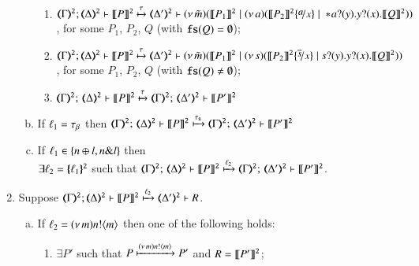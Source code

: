\begin{enumerate}[1.]
\begin{enumerate}[a)]
				\begin{enumerate}[-]
					\item	%
						$
						\horel{\tmap{\Gamma}{2}}{\tmap{\Delta}{2}}{\pmap{P}{2}}
						{\hby{\tau}}
						{\tmap{\Delta'}{2}}{}{\newsp{\tilde{m}}{\pmap{P_1}{2} \Par \newsp{a}
						{\pmap{P_2}{2}\subst{a}{x} \Par \repl{} \binp{a}{y} \binp{y}{x} \pmap{Q}{2}}}}
						$, for some $P_1$, $P_2$, $Q$ (with { $\mathtt{fs}(Q) = \emptyset$});

					\item	%
						$
						\horel{\tmap{\Gamma}{2}}{\tmap{\Delta}{2}}{\pmap{P}{2}}
						{\hby{\tau}}
						{\tmap{\Delta'}{2}}{}{\newsp{\tilde{m}}{\pmap{P_1}{2} \Par \newsp{s}
						{\pmap{P_2}{2}\subst{\dual{s}}{x} \Par \binp{s}{y} \binp{y}{x} \pmap{Q}{2}}}}
						$, for some $P_1$, $P_2$, $Q$ (with { $\mathtt{fs}(Q) \neq \emptyset$});

					\item	%
						$\tmap{\Gamma}{2};\, \tmap{\Delta}{2} \proves \pmap{P}{2}
						\hby{\tau}
						\tmap{\Gamma}{2};\, \tmap{\Delta'}{2} \proves \pmap{P'}{2}$


				\end{enumerate}
				
				\item	If $\ell_1 = \tau_{\beta}$ then
						$\tmap{\Gamma}{2};\, \tmap{\Delta}{2} \proves \pmap{P}{2}
						\hby{\stau}
						\tmap{\Gamma}{2};\, \tmap{\Delta'}{2} \proves \pmap{P'}{2}$

 

			\item	 
				If  
				$\ell_1 \in \{n \oplus l, n \& l\}$
				 then \\
				$\exists \ell_2 = \{\!\!\{\ell_1\}\!\!\}^{\mathtt{2}}$ such that 
				$\tmap{\Gamma}{2};\,\tmap{\Delta}{2} \proves  \pmap{P}{2}
				\hby{\ell_2}
				\tmap{\Gamma}{2};\,\tmap{\Delta'}{2} \proves  \pmap{P'}{2}$.			
		\end{enumerate}
		
		\item Suppose 
		$\stytra{\tmap{\Gamma}{2}}{\ell_2}{\tmap{\Delta}{2}}{\pmap{P}{2}}{\tmap{\Delta'}{2}}{R}$.
			\begin{enumerate}[a)]
				\item %
					If  
					$\ell_2 = (\nu\, m)n ! \langle m \rangle$
					then 
					one of the following holds:
					\begin{enumerate}[-]
					\item	$\exists P'$ such that $P \xmapsto{(\nu\, m) n !\langle m \rangle} P'$
						and $R = \llbracket P'\rrbracket^\mathtt{2}$;


\end{enumerate}
\end{enumerate}
\end{enumerate}
